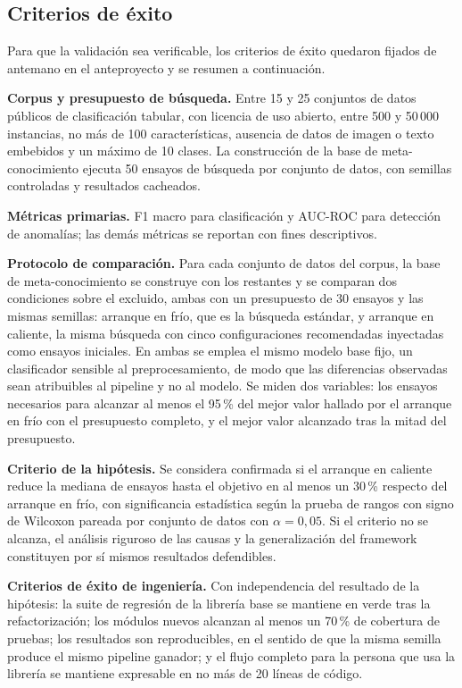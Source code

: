 \documentclass[12pt,letterpaper,oneside]{article}
\begin{document}
\subsection{Criterios de éxito}

Para que la validación sea verificable, los criterios de éxito quedaron fijados de
antemano en el anteproyecto \cite{borbon2026anteproyecto} y se resumen a continuación.

\textbf{Corpus y presupuesto de búsqueda.} Entre 15 y 25 conjuntos de datos públicos de
clasificación tabular, con licencia de uso abierto, entre 500 y 50\,000 instancias, no más
de 100 características, ausencia de datos de imagen o texto embebidos y un máximo de 10
clases. La construcción de la base de meta-conocimiento ejecuta 50 ensayos de búsqueda por
conjunto de datos, con semillas controladas y resultados cacheados.

\textbf{Métricas primarias.} F1 macro para clasificación y AUC-ROC para detección de
anomalías; las demás métricas se reportan con fines descriptivos.

\textbf{Protocolo de comparación.} Para cada conjunto de datos del corpus, la base de
meta-conocimiento se construye con los restantes y se comparan dos condiciones sobre el
excluido, ambas con un presupuesto de 30 ensayos y las mismas semillas: arranque en frío,
que es la búsqueda estándar, y arranque en caliente, la misma búsqueda con cinco
configuraciones recomendadas inyectadas como ensayos iniciales. En ambas se emplea el mismo
modelo base fijo, un clasificador sensible al preprocesamiento, de modo que las diferencias
observadas sean atribuibles al pipeline y no al modelo. Se miden dos variables: los ensayos
necesarios para alcanzar al menos el 95\,\% del mejor valor hallado por el arranque en frío
con el presupuesto completo, y el mejor valor alcanzado tras la mitad del presupuesto.

\textbf{Criterio de la hipótesis.} Se considera confirmada si el arranque en caliente
reduce la mediana de ensayos hasta el objetivo en al menos un 30\,\% respecto del arranque
en frío, con significancia estadística según la prueba de rangos con signo de Wilcoxon
pareada por conjunto de datos con $\alpha = 0{,}05$. Si el criterio no se alcanza, el
análisis riguroso de las causas y la generalización del framework constituyen por sí mismos
resultados defendibles.

\textbf{Criterios de éxito de ingeniería.} Con independencia del resultado de la hipótesis:
la suite de regresión de la librería base se mantiene en verde tras la refactorización; los
módulos nuevos alcanzan al menos un 70\,\% de cobertura de pruebas; los resultados son
reproducibles, en el sentido de que la misma semilla produce el mismo pipeline ganador; y
el flujo completo para la persona que usa la librería se mantiene expresable en no más de
20 líneas de código.
\end{document}
